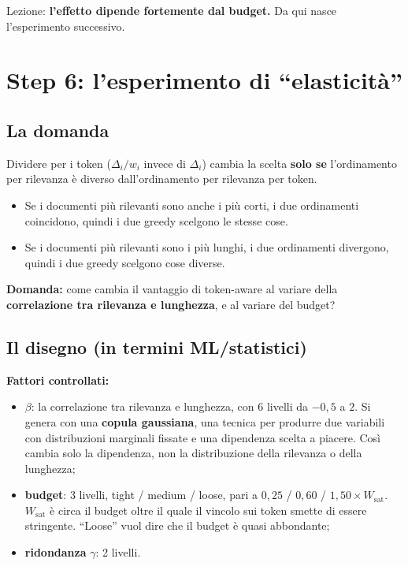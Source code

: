 \documentclass[11pt,a4paper]{article}
\begin{document}
\begin{nota}
Lezione: \textbf{l'effetto dipende fortemente dal budget.} Da qui nasce l'esperimento successivo.
\end{nota}

\section{Step 6: l'esperimento di ``elasticità''}

\subsection{La domanda}

Dividere per i token ($\Delta_i / w_i$ invece di $\Delta_i$) cambia la scelta \textbf{solo se} l'ordinamento per rilevanza è diverso dall'ordinamento per rilevanza per token.
\begin{itemize}
  \item Se i documenti più rilevanti sono anche i più corti, i due ordinamenti coincidono, quindi i due greedy scelgono le stesse cose.
  \item Se i documenti più rilevanti sono i più lunghi, i due ordinamenti divergono, quindi i due greedy scelgono cose diverse.
\end{itemize}

\begin{nota}
\textbf{Domanda:} come cambia il vantaggio di token-aware al variare della \textbf{correlazione tra rilevanza e lunghezza}, e al variare del budget?
\end{nota}

\subsection{Il disegno (in termini ML/statistici)}

\textbf{Fattori controllati:}
\begin{itemize}
  \item $\beta$: la correlazione tra rilevanza e lunghezza, con 6 livelli da $-0{,}5$ a $2$. Si genera con una \textbf{copula gaussiana}, una tecnica per produrre due variabili con distribuzioni marginali fissate e una dipendenza scelta a piacere. Così cambia solo la dipendenza, non la distribuzione della rilevanza o della lunghezza;
  \item \textbf{budget}: 3 livelli, tight / medium / loose, pari a $0{,}25$ / $0{,}60$ / $1{,}50 \times W_{\text{sat}}$. $W_{\text{sat}}$ è circa il budget oltre il quale il vincolo sui token smette di essere stringente. ``Loose'' vuol dire che il budget è quasi abbondante;
  \item \textbf{ridondanza} $\gamma$: 2 livelli.
\end{itemize}
\end{document}
